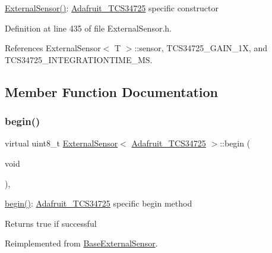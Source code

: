 \hyperlink{class_external_sensor_3_01_adafruit___t_c_s34725_01_4_a3b1855d165d295332b53e074344e3281}{External\+Sensor()}\+: \hyperlink{class_adafruit___t_c_s34725}{Adafruit\+\_\+\+T\+C\+S34725} specific constructor 

Definition at line 435 of file External\+Sensor.\+h.



References External\+Sensor$<$ T $>$\+::sensor, T\+C\+S34725\+\_\+\+G\+A\+I\+N\+\_\+1X, and T\+C\+S34725\+\_\+\+I\+N\+T\+E\+G\+R\+A\+T\+I\+O\+N\+T\+I\+M\+E\+\_\+MS.



\subsection{Member Function Documentation}
\mbox{\label{class_external_sensor_3_01_adafruit___t_c_s34725_01_4_ad9c1d1ac1f34ce1c153a0563d9cc55df}} 
\subsubsection{\texorpdfstring{begin()}{begin()}}
{\footnotesize\ttfamily virtual uint8\+\_\+t \hyperlink{class_external_sensor}{External\+Sensor}$<$ \hyperlink{class_adafruit___t_c_s34725}{Adafruit\+\_\+\+T\+C\+S34725} $>$\+::begin (\begin{DoxyParamCaption}\item[{void}]{ }\end{DoxyParamCaption})\hspace{0.3cm}{\ttfamily [inline]}, {\ttfamily [virtual]}}

\hyperlink{class_external_sensor_3_01_adafruit___t_c_s34725_01_4_ad9c1d1ac1f34ce1c153a0563d9cc55df}{begin()}\+: \hyperlink{class_adafruit___t_c_s34725}{Adafruit\+\_\+\+T\+C\+S34725} specific begin method

\begin{DoxyReturn}{Returns}
true if successful 
\end{DoxyReturn}


Reimplemented from \hyperlink{class_base_external_sensor_a87d132803d4f4fdd4e66332809f0c9a0}{Base\+External\+Sensor}.



